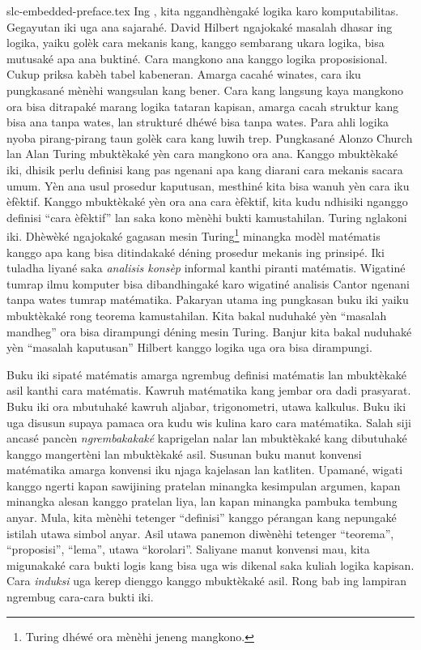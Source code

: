 \begin{filecontents*}[overwrite]{slc-embedded-preface.tex}
Ing , kita nggandhèngaké logika karo
komputabilitas. Gegayutan iki uga ana sajarahé. David Hilbert
ngajokaké masalah dhasar ing logika, yaiku golèk cara mekanis kang,
kanggo sembarang ukara logika, bisa mutusaké apa ana buktiné. Cara
mangkono ana kanggo logika proposisional. Cukup priksa kabèh tabel
kabeneran. Amarga cacahé winates, cara iku pungkasané mènèhi wangsulan
kang bener. Cara kang langsung kaya mangkono ora bisa ditrapaké
marang logika tataran kapisan, amarga cacah struktur kang bisa ana
tanpa wates, lan strukturé dhéwé bisa tanpa wates. Para ahli logika
nyoba pirang-pirang taun golèk cara kang luwih trep. Pungkasané
Alonzo Church lan Alan Turing mbuktèkaké yèn cara mangkono ora ana.
Kanggo mbuktèkaké iki, dhisik perlu definisi kang pas ngenani apa
kang diarani cara mekanis sacara umum. Yèn ana usul prosedur
kaputusan, mesthiné kita bisa wanuh yèn cara iku èfèktif. Kanggo
mbuktèkaké yèn ora ana cara èfèktif, kita kudu ndhisiki nganggo
definisi “cara èfèktif” lan saka kono mènèhi bukti kamustahilan.
Turing nglakoni iki. Dhèwèké ngajokaké gagasan mesin
Turing\footnote{Turing dhéwé ora mènèhi jeneng mangkono.} minangka
modèl matématis kanggo apa kang bisa ditindakaké déning prosedur
mekanis ing prinsipé. Iki tuladha liyané saka \emph{analisis
konsèp} informal kanthi piranti matématis. Wigatiné tumrap ilmu
komputer bisa dibandhingaké karo wigatiné analisis Cantor ngenani
tanpa wates tumrap matématika. Pakaryan utama ing pungkasan buku iki
yaiku mbuktèkaké rong teorema kamustahilan. Kita bakal nuduhaké yèn
“masalah mandheg” ora bisa dirampungi déning mesin Turing. Banjur
kita bakal nuduhaké yèn “masalah kaputusan” Hilbert kanggo logika
uga ora bisa dirampungi.

Buku iki sipaté matématis amarga ngrembug definisi matématis lan
mbuktèkaké asil kanthi cara matématis. Kawruh matématika kang jembar
ora dadi prasyarat. Buku iki ora mbutuhaké kawruh aljabar,
trigonometri, utawa kalkulus. Buku iki uga disusun supaya pamaca
ora kudu wis kulina karo cara matématika. Salah siji ancasé pancèn
\emph{ngrembakakaké} kaprigelan nalar lan mbuktèkaké kang dibutuhaké
kanggo mangertèni lan mbuktèkaké asil. Susunan buku manut konvensi
matématika amarga konvensi iku njaga kajelasan lan katliten.
Upamané, wigati kanggo ngerti kapan sawijining pratelan minangka
kesimpulan argumen, kapan minangka alesan kanggo pratelan liya, lan
kapan minangka pambuka tembung anyar. Mula, kita mènèhi tetenger
“definisi” kanggo pérangan kang nepungaké istilah utawa simbol anyar.
Asil utawa panemon diwènèhi tetenger “teorema”, “proposisi”,
“lema”, utawa “korolari”. Saliyane manut konvensi mau, kita
migunakaké cara bukti logis kang bisa uga wis dikenal saka kuliah
logika kapisan. Cara \emph{induksi} uga kerep dienggo kanggo
mbuktèkaké asil. Rong bab ing lampiran ngrembug cara-cara bukti iki.


\end{filecontents*}

